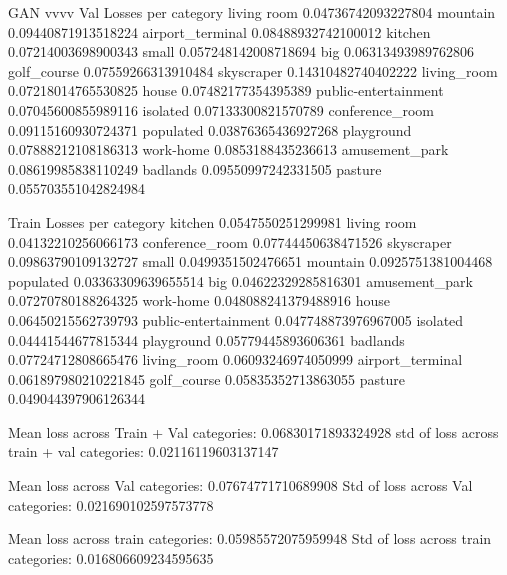 \documentclass{UoYCSproject}
\begin{document}
GAN vvvv
Val Losses per category
living room 0.04736742093227804
mountain 0.09440871913518224
airport_terminal 0.08488932742100012
kitchen 0.07214003698900343
small 0.057248142008718694
big 0.06313493989762806
golf_course 0.07559266313910484
skyscraper 0.14310482740402222
living_room 0.07218014765530825
house 0.07482177354395389
public-entertainment 0.07045600855989116
isolated 0.07133300821570789
conference_room 0.09115160930724371
populated 0.03876365436927268
playground 0.07888212108186313
work-home 0.0853188435236613
amusement_park 0.08619985838110249
badlands 0.09550997242331505
pasture 0.055703551042824984

Train Losses per category
kitchen 0.0547550251299981
living room 0.04132210256066173
conference_room 0.07744450638471526
skyscraper 0.09863790109132727
small 0.0499351502476651
mountain 0.0925751381004468
populated 0.03363309639655514
big 0.04622329285816301
amusement_park 0.07270780188264325
work-home 0.048088241379488916
house 0.06450215562739793
public-entertainment 0.047748873976967005
isolated 0.04441544677815344
playground 0.05779445893606361
badlands 0.07724712808665476
living_room 0.06093246974050999
airport_terminal 0.061897980210221845
golf_course 0.05835352713863055
pasture 0.049044397906126344

Mean loss across Train + Val categories: 0.06830171893324928
std of loss across train + val categories: 0.02116119603137147

Mean loss across Val categories: 0.07674771710689908
Std of loss across Val categories: 0.021690102597573778

Mean loss across train categories: 0.05985572075959948
Std of loss across train categories: 0.016806609234595635
\end{document}
